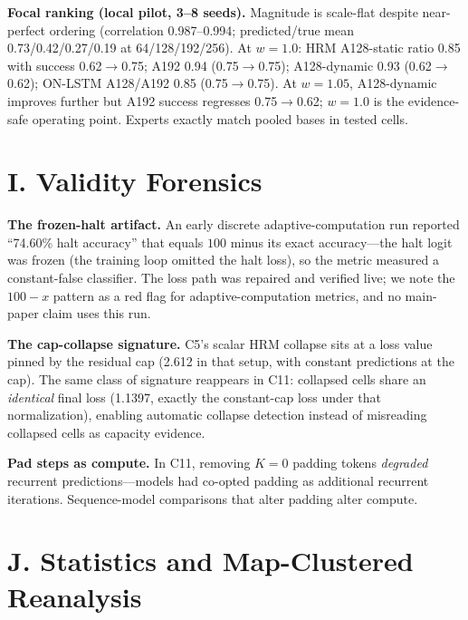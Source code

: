 \documentclass[letterpaper]{article} %
\newcommand{\stage}[1]{\textsc{#1}}
\begin{document}
\textbf{Focal ranking (local pilot, 3--8 seeds).} Magnitude is scale-flat despite near-perfect ordering (correlation 0.987--0.994; predicted/true mean 0.73/0.42/0.27/0.19 at 64/128/192/256). At $w{=}1.0$: HRM A128-static ratio 0.85 with success 0.62$\to$0.75; A192 0.94 (0.75$\to$0.75); A128-dynamic 0.93 (0.62$\to$0.62); ON-LSTM A128/A192 0.85 (0.75$\to$0.75). At $w{=}1.05$, A128-dynamic improves further but A192 success regresses 0.75$\to$0.62; $w{=}1.0$ is the evidence-safe operating point. Experts exactly match pooled bases in tested cells.

\section{I. Validity Forensics}

\textbf{The frozen-halt artifact.} An early discrete adaptive-computation run reported ``74.60\% halt accuracy'' that equals $100$ minus its exact accuracy---the halt logit was frozen (the training loop omitted the halt loss), so the metric measured a constant-false classifier. The loss path was repaired and verified live; we note the $100{-}x$ pattern as a red flag for adaptive-computation metrics, and no main-paper claim uses this run.

\textbf{The cap-collapse signature.} \stage{C5}'s scalar HRM collapse sits at a loss value pinned by the residual cap (2.612 in that setup, with constant predictions at the cap). The same class of signature reappears in \stage{C11}: collapsed cells share an \emph{identical} final loss (1.1397, exactly the constant-cap loss under that normalization), enabling automatic collapse detection instead of misreading collapsed cells as capacity evidence.

\textbf{Pad steps as compute.} In \stage{C11}, removing $K{=}0$ padding tokens \emph{degraded} recurrent predictions---models had co-opted padding as additional recurrent iterations. Sequence-model comparisons that alter padding alter compute.

\section{J. Statistics and Map-Clustered Reanalysis}
\end{document}
